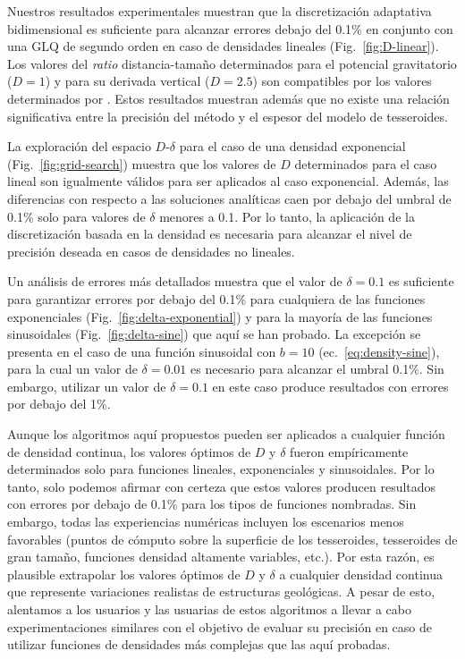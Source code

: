 Nuestros resultados experimentales muestran que la discretización adaptativa
bidimensional es suficiente para alcanzar errores debajo del 0.1\% en conjunto
con una \ac{GLQ} de segundo orden en caso de densidades lineales
(Fig.~\ref{fig:D-linear}).
Los valores del \emph{ratio} distancia-tamaño determinados para el potencial
gravitatorio ($D=1$) y para su derivada vertical ($D=2.5$) son compatibles por
los valores determinados por \citet{uieda2016}.
Estos resultados muestran además que no existe una relación significativa entre
la precisión del método y el espesor del modelo de tesseroides.

La exploración del espacio $D$-$\delta$ para el caso de una densidad
exponencial (Fig.~\ref{fig:grid-search}) muestra que los valores de $D$
determinados para el caso lineal son igualmente válidos para ser aplicados al
caso exponencial.
Además, las diferencias con respecto a las soluciones analíticas caen por
debajo del umbral de 0.1\% solo para valores de $\delta$ menores a 0.1.
Por lo tanto, la aplicación de la discretización basada en la densidad es
necesaria para alcanzar el nivel de precisión deseada en casos de
densidades no lineales.

Un análisis de errores más detallados muestra que el valor de $\delta = 0.1$ es
suficiente para garantizar errores por debajo del 0.1\% para cualquiera de las
funciones exponenciales (Fig.~\ref{fig:delta-exponential}) y para la mayoría de
las funciones sinusoidales (Fig.~\ref{fig:delta-sine}) que aquí se han probado.
La excepción se presenta en el caso de una función sinusoidal con $b = 10$
(ec.~\ref{eq:density-sine}),
para la cual un valor de $\delta = 0.01$ es necesario para alcanzar el umbral
0.1\%.
Sin embargo, utilizar un valor de $\delta = 0.1$ en este caso produce
resultados con errores por debajo del 1\%.

Aunque los algoritmos aquí propuestos pueden ser aplicados a cualquier función
de densidad continua, los valores óptimos de $D$ y $\delta$ fueron
empíricamente determinados solo para funciones lineales, exponenciales
y sinusoidales.
Por lo tanto, solo podemos afirmar con certeza que estos valores producen
resultados con errores por debajo de 0.1\% para los tipos de funciones
nombradas.
Sin embargo, todas las experiencias numéricas incluyen los escenarios menos
favorables (puntos de cómputo sobre la superficie de los tesseroides,
tesseroides de gran tamaño, funciones densidad altamente variables, etc.).
Por esta razón, es plausible extrapolar los valores óptimos de $D$ y $\delta$
a cualquier densidad continua que represente variaciones realistas de
estructuras geológicas.
A pesar de esto, alentamos a los usuarios y las usuarias de estos algoritmos
a llevar a cabo experimentaciones similares con el objetivo de evaluar su
precisión en caso de utilizar funciones de densidades más complejas que las
aquí probadas.

